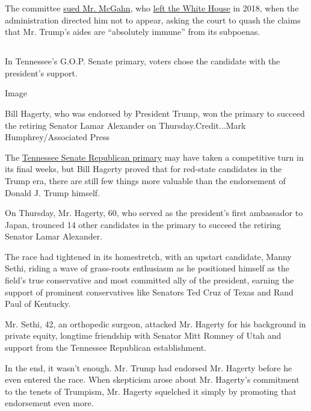 The committee
\href{https://www.nytimes3xbfgragh.onion/2019/08/07/us/politics/don-mcgahn-subpoena.html}{sued
Mr. McGahn}, who
\href{https://www.nytimes3xbfgragh.onion/interactive/2018/03/16/us/politics/all-the-major-firings-and-resignations-in-trump-administration.html}{left
the White House} in 2018, when the administration directed him not to
appear, asking the court to quash the claims that Mr. Trump's aides are
``absolutely immune'' from its subpoenas.

\hypertarget{section-7}{%
\subsection{}\label{section-7}}

In Tennessee's G.O.P. Senate primary, voters chose the candidate with
the president's support.

Image

Bill Hagerty, who was endorsed by President Trump, won the primary to
succeed the retiring Senator Lamar Alexander on Thursday.Credit...Mark
Humphrey/Associated Press

The
\href{https://www.nytimes3xbfgragh.onion/2020/08/06/us/politics/tennessee-senate-primary-hagerty.html}{Tennessee
Senate Republican primary} may have taken a competitive turn in its
final weeks, but Bill Hagerty proved that for red-state candidates in
the Trump era, there are still few things more valuable than the
endorsement of Donald J. Trump himself.

On Thursday, Mr. Hagerty, 60, who served as the president's first
ambassador to Japan, trounced 14 other candidates in the primary to
succeed the retiring Senator Lamar Alexander.

The race had tightened in its homestretch, with an upstart candidate,
Manny Sethi, riding a wave of grass-roots enthusiasm as he positioned
himself as the field's true conservative and most committed ally of the
president, earning the support of prominent conservatives like Senators
Ted Cruz of Texas and Rand Paul of Kentucky.

Mr. Sethi, 42, an orthopedic surgeon, attacked Mr. Hagerty for his
background in private equity, longtime friendship with Senator Mitt
Romney of Utah and support from the Tennessee Republican establishment.

In the end, it wasn't enough. Mr. Trump had endorsed Mr. Hagerty before
he even entered the race. When skepticism arose about Mr. Hagerty's
commitment to the tenets of Trumpism, Mr. Hagerty squelched it simply by
promoting that endorsement even more.

